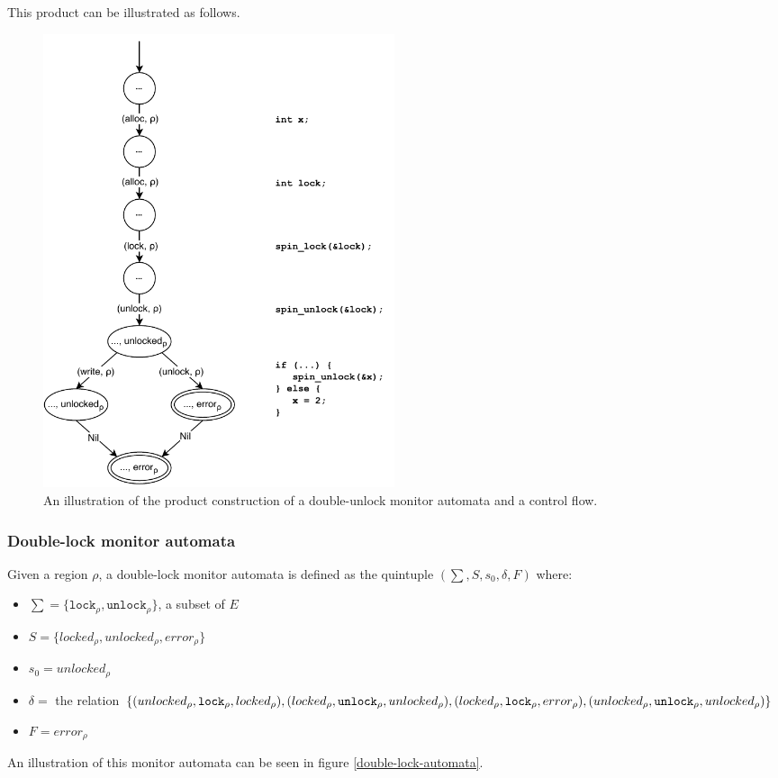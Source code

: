 \noindent This product can be illustrated as follows. 

\begin{figure}[H]
    \centering
    \includegraphics[width=0.5\textwidth]{background/figures/cfg_unlock-product}
    \caption{An illustration of the product construction of a double-unlock monitor automata and a control flow.}
    \label{cfg_unlock-product}
\end{figure}

\subsubsection{Double-lock monitor automata}

Given a region $\rho$, a double-lock monitor automata is defined as the quintuple $(\sum, S, s_0, \delta, F)$ where: 

\begin{itemize}
    \item $\sum = \{\texttt{lock}_\rho, \texttt{unlock}_\rho\}$, a subset of $E$
    \item $S = \{ locked_\rho, unlocked_\rho, error_\rho \}$
    \item $s_0 = unlocked_\rho$ 
    \item $\delta =$ the relation $\{(unlocked_\rho, \texttt{lock}_\rho, locked_\rho), (locked_\rho, \texttt{unlock}_\rho, unlocked_\rho), \\
    (locked_\rho, \texttt{lock}_\rho, error_\rho), (unlocked_\rho, \texttt{unlock}_\rho, unlocked_\rho)\}$ 
    \item $F = error_\rho$  
\end{itemize}

An illustration of this monitor automata can be seen in figure \ref{double-lock-automata}. 

